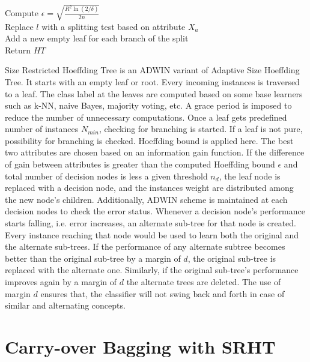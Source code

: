 \begin{algorithm}[htbp]
{{{{                    Compute $\epsilon = \sqrt{\frac{R^2 \ln(2/\delta)}{2n}}$   \\
                    
                     {
                         {
                            Replace $l$ with a splitting test based on attribute $X_a$ \\
                            Add a new empty leaf for each branch of the split \\
                        }
                    }
                }
            }
        }
    Return $HT$
    }
\end{algorithm}

Size Restricted Hoeffding Tree is an ADWIN variant of Adaptive Size Hoeffding Tree. It starts with an empty leaf or root. Every incoming instances is traversed to a leaf. The class label at the leaves are computed based on some base learners such as k-NN, naive Bayes, majority voting, etc. A grace period is imposed to reduce the number of unnecessary computations. Once a leaf gets predefined number of instances $N_{min}$, checking for branching is started. If a leaf is not pure, possibility for branching is checked. Hoeffding bound is applied here. The best two attributes  are chosen based on an information gain function. If the difference of gain between attributes is greater than the computed Hoeffding bound $\epsilon$ and total number of decision nodes is less a given threshold $n_d$, the leaf node is replaced with a decision node, and the instances weight are distributed among the new node's children. Additionally, ADWIN scheme is maintained at each decision nodes to check the error status. Whenever a decision node's performance starts falling, i.e. error increases, an alternate sub-tree for that node is created. Every instance reaching that node would be used to learn both the original and the alternate sub-trees. If the performance of any alternate subtree becomes better than the original sub-tree by a margin of $d$, the original sub-tree is replaced with the alternate one. Similarly, if the original sub-tree's performance improves again by a margin of $d$ the alternate trees are deleted. The use of margin $d$ ensures that, the classifier will not swing back and forth in case of similar and alternating concepts.

\section{Carry-over Bagging with SRHT}

